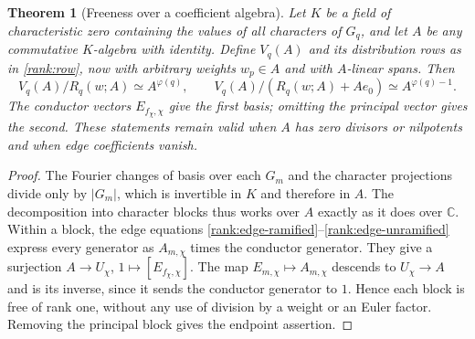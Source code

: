 \documentclass[11pt,a4paper]{article}
\newtheorem{theorem}{Theorem}[section]
\theoremstyle{definition}
\theoremstyle{remark}
\numberwithin{equation}{section}
\begin{document}
\begin{theorem}[Freeness over a coefficient algebra]\label{rank:algebra}
Let $K$ be a field of characteristic zero containing the values of all
characters of $G_q$, and let $A$ be any commutative $K$-algebra with
identity.  Define $V_q(A)$ and its distribution rows as in
\eqref{rank:row}, now with arbitrary weights $w_p\in A$ and with
$A$-linear spans.  Then
\[
 V_q(A)/R_q(w;A)\simeq A^{\varphi(q)},\qquad
 V_q(A)/(R_q(w;A)+Ae_0)\simeq A^{\varphi(q)-1}.
\]
The conductor vectors $E_{f_\chi,\chi}$ give the first basis; omitting
the principal vector gives the second.  These statements remain valid
when $A$ has zero divisors or nilpotents and when edge coefficients vanish.
\end{theorem}
\begin{proof}
The Fourier changes of basis over each $G_m$ and the character
projections divide only by $|G_m|$, which is invertible in $K$ and
therefore in $A$.  The decomposition into character blocks thus works
over $A$ exactly as it does over $\mathbb C$.
Within a block, the edge equations
\eqref{rank:edge-ramified}--\eqref{rank:edge-unramified} express every
generator as $A_{m,\chi}$ times the conductor generator.  They give a
surjection $A\to U_\chi$, $1\mapsto[E_{f_\chi,\chi}]$.
The map $E_{m,\chi}\mapsto A_{m,\chi}$ descends to $U_\chi\to A$
and is its inverse, since it sends the conductor generator to $1$.
Hence each block is free of rank one, without any use of division by
a weight or an Euler factor.  Removing the principal block gives the
endpoint assertion.
\end{proof}
\end{document}
